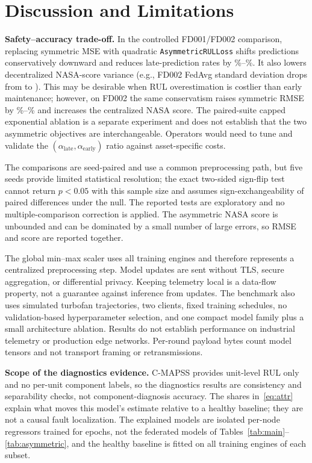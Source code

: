 \section{Discussion and Limitations}
\label{sec:discussion}

\textbf{Safety--accuracy trade-off.} In the controlled FD001/FD002 comparison, replacing symmetric MSE with quadratic \texttt{AsymmetricRULLoss} shifts predictions conservatively downward and reduces late-prediction rates by \AsymLateReductionMin{}\%--\AsymLateReductionMax{}\%. It also lowers decentralized NASA-score variance (e.g., FD002 FedAvg standard deviation drops from \AsymFdTwoFedMseNasaStd{} to \AsymFdTwoFedAsyNasaStd{}). This may be desirable when RUL overestimation is costlier than early maintenance; however, on FD002 the same conservatism raises symmetric RMSE by \AsymFdTwoRmseIncreaseMin{}\%--\AsymFdTwoRmseIncreaseMax{}\% and increases the centralized NASA score. The paired-suite capped exponential ablation is a separate experiment and does not establish that the two asymmetric objectives are interchangeable. Operators would need to tune and validate the $(\alpha_{\text{late}}, \alpha_{\text{early}})$ ratio against asset-specific costs.

The comparisons are seed-paired and use a common preprocessing path, but five seeds provide limited statistical resolution; the exact two-sided sign-flip test cannot return $p<0.05$ with this sample size and assumes sign-exchangeability of paired differences under the null. The reported tests are exploratory and no multiple-comparison correction is applied. The asymmetric NASA score is unbounded and can be dominated by a small number of large errors, so RMSE and score are reported together.

The global min--max scaler uses all training engines and therefore represents a centralized preprocessing step. Model updates are sent without TLS, secure aggregation, or differential privacy. Keeping telemetry local is a data-flow property, not a guarantee against inference from updates. The benchmark also uses simulated turbofan trajectories, two clients, fixed training schedules, no validation-based hyperparameter selection, and one compact model family plus a small architecture ablation. Results do not establish performance on industrial telemetry or production edge networks. Per-round payload bytes count model tensors and not transport framing or retransmissions.

\textbf{Scope of the diagnostics evidence.} C-MAPSS provides unit-level RUL only and no per-unit component labels, so the diagnostics results are consistency and separability checks, not component-diagnosis accuracy. The shares in~\eqref{eq:attr} explain what moves this model's estimate relative to a healthy baseline; they are not a causal fault localization. The explained models are isolated per-node regressors trained for \DiagEpochs{} epochs, not the federated models of Tables~\ref{tab:main}--\ref{tab:asymmetric}, and the healthy baseline is fitted on all training engines of each subset.

